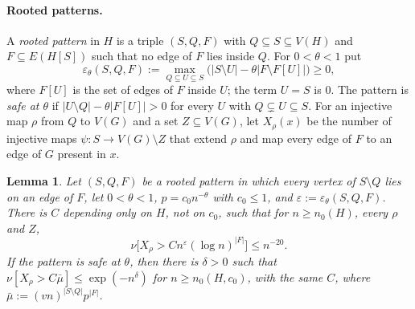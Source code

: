 \documentclass[11pt]{article}
\newtheorem{lemma}[theorem]{Lemma}
\theoremstyle{remark}
\newcommand{\abs}[1]{\lvert #1\rvert}
\begin{document}
\paragraph{Rooted patterns.} A \emph{rooted pattern} in $H$ is a triple $(S,Q,F)$ with $Q\subseteq S\subseteq V(H)$ and $F\subseteq E(H[S])$ such that no edge of $F$ lies inside $Q$. For $0<\theta<1$ put
\[\varepsilon_\theta(S,Q,F):=\max_{Q\subseteq U\subseteq S}\bigl(\abs{S\setminus U}-\theta\abs{F\setminus F[U]}\bigr)\ge0,\]
where $F[U]$ is the set of edges of $F$ inside $U$; the term $U=S$ is $0$. The pattern is \emph{safe at $\theta$} if $\abs{U\setminus Q}-\theta\abs{F[U]}>0$ for every $U$ with $Q\subsetneq U\subseteq S$. For an injective map $\rho$ from $Q$ to $V(G)$ and a set $Z\subseteq V(G)$, let $X_\rho(x)$ be the number of injective maps $\psi:S\to V(G)\setminus Z$ that extend $\rho$ and map every edge of $F$ to an edge of $G$ present in $x$.

\begin{lemma}\label{lem:count}
Let $(S,Q,F)$ be a rooted pattern in which every vertex of $S\setminus Q$ lies on an edge of $F$, let $0<\theta<1$, $p=c_0n^{-\theta}$ with $c_0\le1$, and $\varepsilon:=\varepsilon_\theta(S,Q,F)$. There is $C$ depending only on $H$, not on $c_0$, such that for $n\ge n_0(H)$, every $\rho$ and $Z$,
\[\nu\bigl[X_\rho>Cn^\varepsilon(\log n)^{\abs F}\bigr]\le n^{-20}.\]
If the pattern is safe at $\theta$, then there is $\delta>0$ such that $\nu[X_\rho>C\bar\mu]\le\exp(-n^\delta)$ for $n\ge n_0(H,c_0)$, with the same $C$, where $\bar\mu:=(vn)^{\abs{S\setminus Q}}p^{\abs F}$.
\end{lemma}
\end{document}
